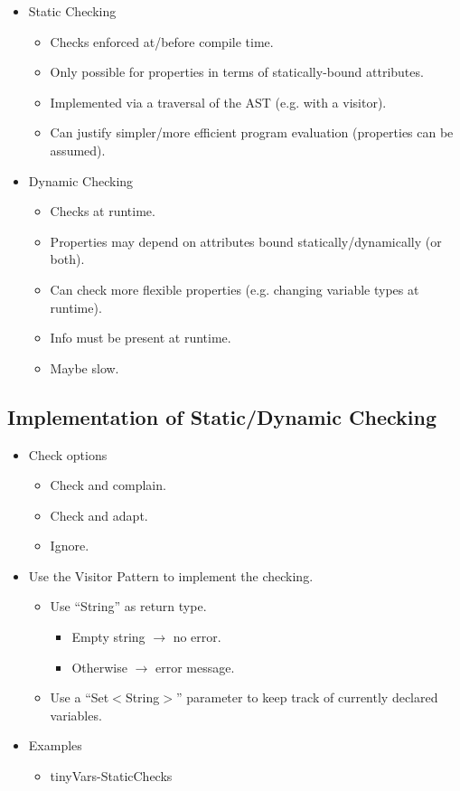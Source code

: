\documentclass{article}
\begin{document}
\begin{itemize}
    \item Static Checking
    \begin{itemize}
        \item Checks enforced at/before compile time.
        \item Only possible for properties in terms of statically-bound attributes.
        \item Implemented via a traversal of the AST (e.g. with a visitor).
        \item Can justify simpler/more efficient program evaluation (properties can be assumed).
    \end{itemize}
    \item Dynamic Checking
    \begin{itemize}
        \item Checks at runtime.
        \item Properties may depend on attributes bound statically/dynamically (or both).
        \item Can check more flexible properties (e.g. changing variable types at runtime).
        \item Info must be present at runtime.
        \item Maybe slow.
    \end{itemize}
\end{itemize}

\subsection{Implementation of Static/Dynamic Checking}

\begin{itemize}
    \item Check options
    \begin{itemize}
        \item Check and complain.
        \item Check and adapt.
        \item Ignore.
    \end{itemize}
    \item Use the Visitor Pattern to implement the checking.
    \begin{itemize}
        \item Use ``String'' as return type.
        \begin{itemize}
            \item Empty string $\rightarrow$ no error.
            \item Otherwise $\rightarrow$ error message.
        \end{itemize}
        \item Use a ``Set$<$String$>$'' parameter to keep track of currently declared variables.
    \end{itemize}
    \item Examples
    \begin{itemize}
        \item tinyVars-StaticChecks
    \end{itemize}
\end{itemize}
\end{document}

